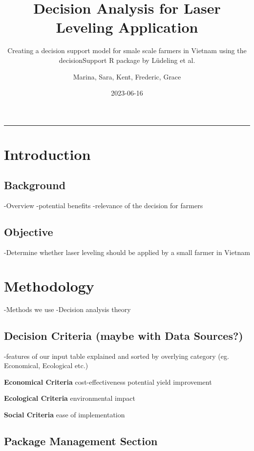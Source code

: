 \documentclass[
]{article}
\title{Decision Analysis for Laser Leveling Application}
\subtitle{Creating a decision support model for smale scale farmers in
Vietnam using the decisionSupport R package by Lüdeling et al.}
\author{Marina, Sara, Kent, Frederic, Grace}
\date{2023-06-16}
\begin{document}
\maketitle

\begin{center}\rule{0.5\linewidth}{0.5pt}\end{center}

\hypertarget{introduction}{%
\section{Introduction}\label{introduction}}

\hypertarget{background}{%
\subsection{Background}\label{background}}

-Overview -potential benefits -relevance of the decision for farmers

\hypertarget{objective}{%
\subsection{Objective}\label{objective}}

-Determine whether laser leveling should be applied by a small farmer in
Vietnam

\hypertarget{methodology}{%
\section{Methodology}\label{methodology}}

-Methods we use -Decision analysis theory

\hypertarget{decision-criteria-maybe-with-data-sources}{%
\subsection{Decision Criteria (maybe with Data
Sources?)}\label{decision-criteria-maybe-with-data-sources}}

-features of our input table explained and sorted by overlying category
(eg. Economical, Ecological etc.)

\textbf{Economical Criteria} cost-effectiveness potential yield
improvement

\textbf{Ecological Criteria} environmental impact

\textbf{Social Criteria} ease of implementation

\hypertarget{package-management-section}{%
\subsection{Package Management
Section}\label{package-management-section}}
\end{document}
